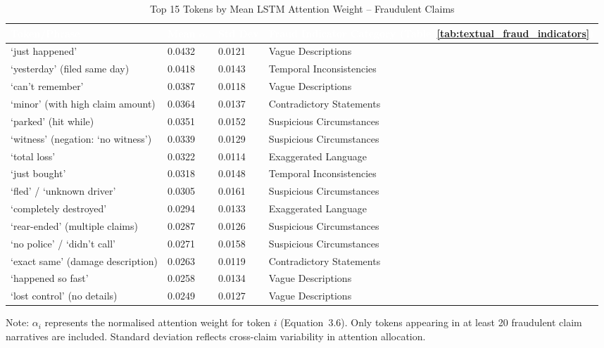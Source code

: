 \documentclass[12pt,a4paper,oneside]{report}
\numberwithin{equation}{chapter}
\renewcommand{\arraystretch}{1.6}
\begin{document}
\begin{table}[H]
\centering
\caption{Top 15 Tokens by Mean LSTM Attention Weight -- Fraudulent Claims}
\label{tab:lstm-attention}
\renewcommand{\arraystretch}{1.4}
\begin{threeparttable}
\begin{tabular}{L{3cm} C{2cm} C{2cm} L{5.5cm}}
\toprule
{}
\textcolor{white}{\textbf{Token/Phrase}} &
\textcolor{white}{\textbf{Mean $\alpha_i$}} &
\textcolor{white}{\textbf{Std Dev}} &
\textcolor{white}{\textbf{Fraud Indicator Category (Table~\ref{tab:textual_fraud_indicators})}} \\
\midrule
{}
`just happened'                      & 0.0432 & 0.0121 & Vague Descriptions \\
`yesterday' (filed same day)         & 0.0418 & 0.0143 & Temporal Inconsistencies \\
`can't remember'                     & 0.0387 & 0.0118 & Vague Descriptions \\
`minor' (with high claim amount)     & 0.0364 & 0.0137 & Contradictory Statements \\
`parked' (hit while)                 & 0.0351 & 0.0152 & Suspicious Circumstances \\
`witness' (negation: `no witness')   & 0.0339 & 0.0129 & Suspicious Circumstances \\
`total loss'                         & 0.0322 & 0.0114 & Exaggerated Language \\
`just bought'                        & 0.0318 & 0.0148 & Temporal Inconsistencies \\
`fled' / `unknown driver'            & 0.0305 & 0.0161 & Suspicious Circumstances \\
`completely destroyed'               & 0.0294 & 0.0133 & Exaggerated Language \\
`rear-ended' (multiple claims)       & 0.0287 & 0.0126 & Suspicious Circumstances \\
`no police' / `didn't call'          & 0.0271 & 0.0158 & Suspicious Circumstances \\
`exact same' (damage description)    & 0.0263 & 0.0119 & Contradictory Statements \\
`happened so fast'                   & 0.0258 & 0.0134 & Vague Descriptions \\
`lost control' (no details)          & 0.0249 & 0.0127 & Vague Descriptions \\
\bottomrule
\end{tabular}
\begin{tablenotes}
\small
\item Note: $\alpha_i$ represents the normalised attention weight for token $i$ (Equation~3.6).
Only tokens appearing in at least 20 fraudulent claim narratives are included. Standard deviation
reflects cross-claim variability in attention allocation.
\end{tablenotes}
\end{threeparttable}
\end{table}
\end{document}
